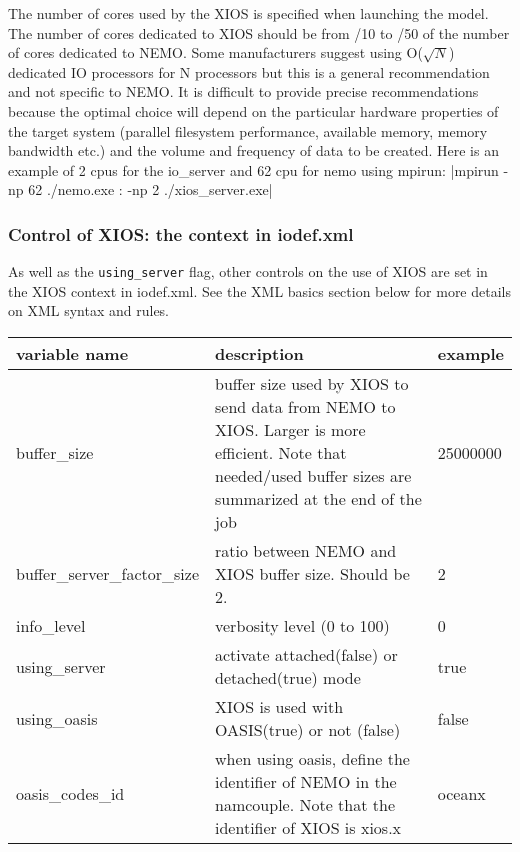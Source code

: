 \documentclass[../main/NEMO_manual]{subfiles}
\begin{document}
The number of cores used by the XIOS is specified when launching the model.
The number of cores dedicated to XIOS should be from /10 to /50 of the number of 
cores dedicated to NEMO.
Some manufacturers suggest using O($\sqrt{N}$) dedicated IO processors for N processors but
this is a general recommendation and not specific to NEMO.
It is difficult to provide precise recommendations because the optimal choice will depend on
the particular hardware properties of the target system 
(parallel filesystem performance, available memory, memory bandwidth etc.)
and the volume and frequency of data to be created.
Here is an example of 2 cpus for the io\_server and 62 cpu for nemo using mpirun:
\cmd|mpirun -np 62 ./nemo.exe : -np 2 ./xios_server.exe|

\subsubsection{Control of XIOS: the context in iodef.xml}

As well as the {\tt using\_server} flag, other controls on the use of XIOS are set in the XIOS context in iodef.xml.
See the XML basics section below for more details on XML syntax and rules.

\begin{table}
  \scriptsize
  \begin{tabularx}{\textwidth}{|lXl|}
    \hline
    variable name                                                           &
    description                                                             &
    example  \\
    \hline
    \hline
    buffer\_size                                                            &
    buffer size used by XIOS to send data from NEMO to XIOS.
    Larger is more efficient.
    Note that needed/used buffer sizes are summarized at the end of the job &
    25000000 \\
    \hline
    buffer\_server\_factor\_size                                            &
    ratio between NEMO and XIOS buffer size.
    Should be 2.                                                            &
    2        \\
    \hline
    info\_level                                                             &
    verbosity level (0 to 100)                                              &
    0        \\
    \hline
    using\_server                                                           &
    activate attached(false) or detached(true) mode                         &
    true     \\
    \hline
    using\_oasis                                                            &
    XIOS is used with OASIS(true) or not (false)                            &
    false    \\
    \hline
    oasis\_codes\_id                                                        &
    when using oasis, define the identifier of NEMO in the namcouple.
    Note that the identifier of XIOS is xios.x                              &
    oceanx   \\
    \hline
  \end{tabularx}
\end{table}
\end{document}
